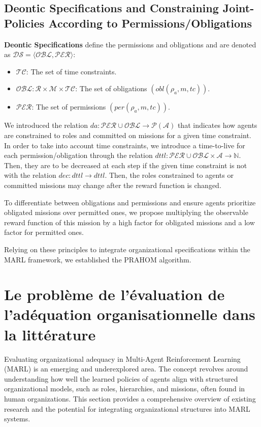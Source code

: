 \documentclass[sigconf,anonymous]{aamas}
\begin{document}
\subsection{Deontic Specifications and Constraining Joint-Policies According to Permissions/Obligations}

\textbf{Deontic Specifications} define the permissions and obligations and are denoted as $\mathcal{DS} = \langle \mathcal{OBL}, \mathcal{PER} \rangle$:

\begin{itemize}
    \item $\mathcal{TC}$: The set of time constraints.
    \item $\mathcal{OBL}: \mathcal{R} \times \mathcal{M} \times \mathcal{TC}$: The set of obligations $(obl(\rho_a, m, tc))$.
    \item $\mathcal{PER}$: The set of permissions $(per(\rho_a, m, tc))$.
\end{itemize}

We introduced the relation $da: \mathcal{PER} \cup \mathcal{OBL} \rightarrow \mathcal{P}(\mathcal{A})$ that indicates how agents are constrained to roles and committed on missions for a given time constraint. In order to take into account time constraints, we introduce a time-to-live for each permission/obligation through the relation $dttl: \mathcal{PER} \cup \mathcal{OBL} \times \mathcal{A} \rightarrow \mathbb{N}$. Then, they are to be decreased at each step if the given time constraint is not  with the relation $dec: dttl \rightarrow dttl$. Then, the roles constrained to agents or committed missions may change after the reward function is changed.

To differentiate between obligations and permissions and ensure agents prioritize obligated missions over permitted ones, we propose multiplying the observable reward function of this mission by a high factor for obligated missions and a low factor for permitted ones.

Relying on these principles to integrate organizational specifications within the MARL framework, we established the PRAHOM algorithm.

\section{Le problème de l'évaluation de l'adéquation organisationnelle dans la littérature}
\label{sec:evaluation_problem}

Evaluating organizational adequacy in Multi-Agent Reinforcement Learning (MARL) is an emerging and underexplored area. The concept revolves around understanding how well the learned policies of agents align with structured organizational models, such as roles, hierarchies, and missions, often found in human organizations. This section provides a comprehensive overview of existing research and the potential for integrating organizational structures into MARL systems.
\end{document}
